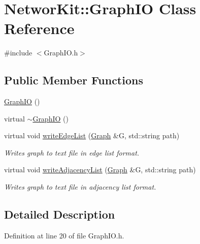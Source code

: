 \hypertarget{class_networ_kit_1_1_graph_i_o}{\section{Networ\-Kit\-:\-:Graph\-I\-O Class Reference}
\label{class_networ_kit_1_1_graph_i_o}
}


{\ttfamily \#include $<$Graph\-I\-O.\-h$>$}

\subsection*{Public Member Functions}
\begin{DoxyCompactItemize}
\item 
\hyperlink{class_networ_kit_1_1_graph_i_o_a42803c373c9621ade10162c534884d0f}{Graph\-I\-O} ()
\item 
virtual \hyperlink{class_networ_kit_1_1_graph_i_o_a894cfd9361c0e6c72167a78752501361}{$\sim$\-Graph\-I\-O} ()
\item 
virtual void \hyperlink{class_networ_kit_1_1_graph_i_o_a8da55a700826f34d53dda22f389701bc}{write\-Edge\-List} (\hyperlink{class_networ_kit_1_1_graph}{Graph} \&G, std\-::string path)
\begin{DoxyCompactList}\small\item\em Writes graph to text file in edge list format. \end{DoxyCompactList}\item 
virtual void \hyperlink{class_networ_kit_1_1_graph_i_o_ac9122f7c03ed73752ab7e5c1de2d9565}{write\-Adjacency\-List} (\hyperlink{class_networ_kit_1_1_graph}{Graph} \&G, std\-::string path)
\begin{DoxyCompactList}\small\item\em Writes graph to text file in adjacency list format. \end{DoxyCompactList}\end{DoxyCompactItemize}


\subsection{Detailed Description}


Definition at line 20 of file Graph\-I\-O.\-h.




